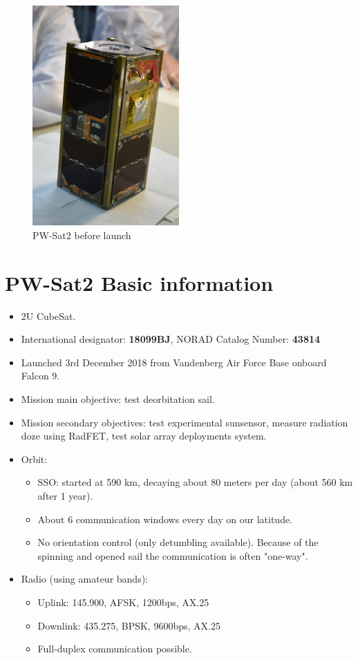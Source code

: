
\begin{figure}
	\centering
	\includegraphics[width=0.5\textwidth]{img/pw-sat.jpg}
	\caption{\label{fig:basic:pw-sat} PW-Sat2 before launch}
\end{figure}

\section{PW-Sat2 Basic information}



\begin{itemize}
 \item 2U CubeSat.
 \item International designator: \textbf{18099BJ}, NORAD Catalog Number: \textbf{43814}
 \item Launched 3rd December 2018 from Vandenberg Air Force Base onboard Falcon 9.
 \item Mission main objective: test deorbitation sail.
 \item Mission secondary objectives: test experimental sunsensor, measure radiation doze using RadFET, test solar array deployments system.
 \item Orbit:
 \begin{itemize}
	\item SSO: started at 590 km, decaying about 80 meters per day (about 560 km after 1 year).
	\item About 6 communication windows every day on our latitude. 
	\item No orientation control (only detumbling available). Because of the spinning and opened sail the communication is often "one-way".	
 \end{itemize}
 \item Radio (using amateur bands):
 \begin{itemize}         
	\item Uplink: 145.900, AFSK, 1200bps, AX.25
    \item Downlink: 435.275, BPSK, 9600bps, AX.25
    \item Full-duplex communication possible.
 \end{itemize}
\end{itemize}
